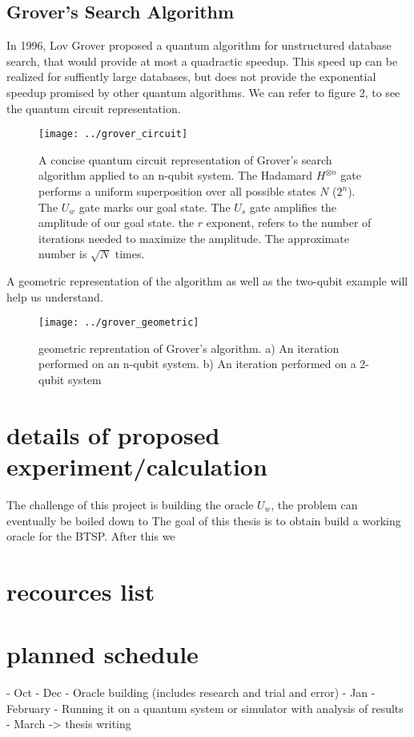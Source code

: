 \documentclass[twocolumn,showpacs,preprintnumbers,amsmath,amssymb]{revtex4}
\begin{document}
		\subsection{Grover's Search Algorithm}
		
		In 1996, Lov Grover proposed a quantum algorithm for unstructured database search, that would provide at most a quadractic speedup. This speed up can be realized for suffiently large databases, but does not provide the exponential speedup promised by other quantum algorithms. We can refer to figure 2, to see the quantum circuit representation.
		
		\begin{figure}[!h]
			\centering
			\texttt{[image: ../grover\_circuit]}
			\caption{A concise quantum circuit representation of Grover's search algorithm applied to an n-qubit system. The Hadamard $H^{\otimes n }$ gate performs a uniform superposition over all possible states $N$ ($2^n$). The $U_w$ gate marks our goal state. The $U_s$ gate amplifies the amplitude of our goal state. the $r$ exponent, refers to the number of iterations needed to maximize the amplitude. The approximate number is $\sqrt{N}$ times.}
			\label{fig:grovercircuit}
		\end{figure}
		
		A geometric representation of the algorithm as well as the two-qubit example will help us understand. 
		
		
		\begin{figure}[!h]
			\centering
			\texttt{[image: ../grover\_geometric]}
			\caption{geometric reprentation of Grover's algorithm. a) An iteration performed on an n-qubit system. b) An iteration performed on a 2-qubit system}
			\label{fig:grovergeometric}
		\end{figure}
		
		
		
		
		
		\section{details of proposed experiment/calculation}
		
		The challenge of this project is building the oracle $U_w$, the problem can eventually be boiled down to The goal of this thesis is to obtain build a working oracle for the BTSP. After this we  
		
		\section{recources list}
		
		
		
		\section{planned schedule}
		
		- Oct - Dec -  Oracle building (includes research and trial and error)
		- Jan - February -  Running it on a quantum system or simulator with analysis of results 
		- March -> thesis writing
		
		
		
	
\end{document}
